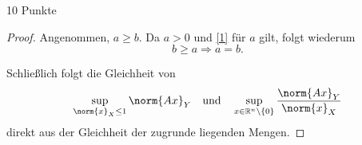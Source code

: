 \documentclass{problemset}
\begin{document}
\begin{problem}{10 Punkte}
\begin{proof}
    Angenommen, \(a \ge b\). Da \(a > 0\) und \eqref{1} für \(a\) gilt, folgt
    wiederum
    \begin{equation*}
        b \ge a \Rightarrow a = b.
    \end{equation*}

    Schließlich folgt die Gleichheit von
    \begin{equation*}
        \sup_{\norm{x}_X \leq 1} \norm{A x}_Y \quad
        \text{und} \quad \sup_{x \in \mathbb{R}^n \setminus \{0\}} \frac{\norm{A x}_Y}{\norm{x}_X}
    \end{equation*}
    direkt aus der Gleichheit der zugrunde liegenden Mengen.
\end{proof}
\end{problem}
\end{document}
